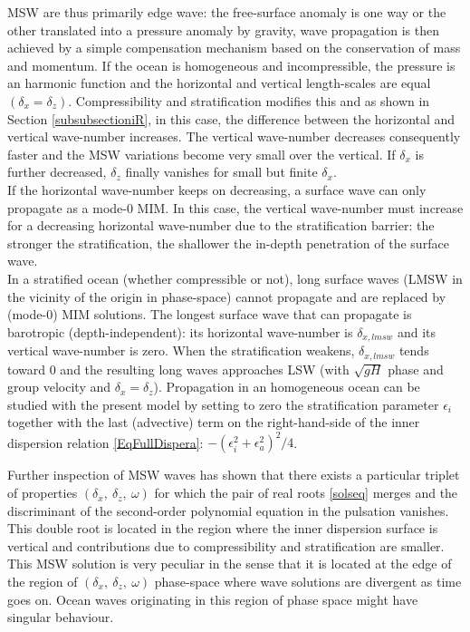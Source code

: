 \documentclass[a4paper,11pt]{article}
\begin{document}
MSW are thus primarily edge wave: the free-surface anomaly is one way or the other translated into a pressure anomaly by gravity, wave propagation is then achieved by a simple compensation mechanism based on the conservation of mass and momentum. If the ocean is homogeneous and incompressible, the pressure is an harmonic function and the horizontal and vertical length-scales are equal $(\delta_x=\delta_z)$. Compressibility and stratification modifies this and as shown in Section \ref{subsubsectioniR}, in this case, the difference between the horizontal and vertical wave-number increases. The vertical wave-number decreases consequently faster and the MSW variations become very small over the vertical. If $\delta_x$ is further decreased, $\delta_z$ finally vanishes for small but finite $\delta_x$.\\
If the horizontal wave-number keeps on decreasing, a surface wave can only propagate as a mode-0 MIM. In this case, the vertical wave-number must increase for a decreasing horizontal wave-number due to the stratification barrier: the stronger the stratification, the shallower the in-depth penetration of the surface wave.\\

In a stratified ocean (whether compressible or not), long surface waves (LMSW in the vicinity of the origin in phase-space) cannot propagate and are replaced by (mode-0) MIM solutions. The longest surface wave that can propagate is barotropic (depth-independent): its horizontal wave-number is $\delta_{x,lmsw}$ and its vertical wave-number is zero. When the stratification weakens, $\delta_{x,lmsw}$ tends toward 0 and the resulting long waves approaches LSW (with $\sqrt{g H}$ phase and group velocity and $\delta_x=\delta_z$).
Propagation in an homogeneous ocean can be studied with the present model by setting to zero the stratification parameter $\epsilon_i$ together with the last (advective) term on the right-hand-side of the inner dispersion relation \ref{EqFullDispera}: $-(\epsilon_i^2+\epsilon_a^2)^2/4$. 

Further inspection of MSW waves has shown that there exists a particular triplet of properties $(\delta_x,\ \delta_z,\ \omega)$ for which the pair of real roots \ref{solseq} merges and the discriminant of the second-order polynomial equation in the pulsation vanishes. This double root is located in the region where the inner dispersion surface is vertical and contributions due to compressibility and stratification are smaller. This MSW solution is very peculiar in the sense that it is located at the edge of the region of $(\delta_x,\ \delta_z,\ \omega)$ phase-space where wave solutions are divergent as time goes on. Ocean waves originating in this region of phase space might have singular behaviour.\\
\end{document}
